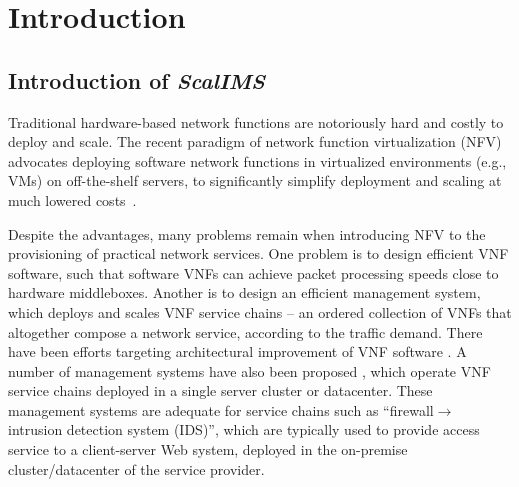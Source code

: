 \chapter {Introduction}
\label{ch:introduction}

\section{Introduction of \textit{ScalIMS}}

Traditional hardware-based network functions are notoriously hard and costly to deploy and scale. The recent paradigm of network function virtualization (NFV) advocates deploying software network functions in virtualized environments (e.g., VMs) on off-the-shelf servers, to significantly simplify deployment and scaling at much lowered costs~\cite{nfv-website}.

Despite the advantages, many problems remain when introducing NFV to the provisioning of practical network services. %
 One problem is to design efficient VNF software, such that software VNFs can achieve packet processing speeds close to hardware middleboxes. Another is to design an efficient management system, which deploys and scales VNF service chains -- an ordered collection of VNFs that altogether compose a network service, according to the traffic demand. There have been efforts targeting architectural improvement of VNF software \cite{martins2014clickos}. A number of management systems have also been proposed \cite{palkar2015e2, gember2012stratos}, which operate VNF service chains deployed in a single server cluster or datacenter. These management systems are adequate for service chains such as ``firewall$\rightarrow$ intrusion detection system (IDS)'', %
 which are typically used to provide access service to a client-server Web system, %
  deployed in the on-premise cluster/datacenter of the service provider.


